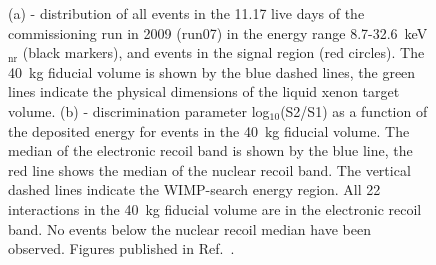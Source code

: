 \begin{figure}[!h]
\centering
{}
\caption[Spatial distribution of events observed in the commissioning run (run07 and discrimination parameter log$_{10}$(S2/S1) as a function of the nuclear recoil energy)]{
 (a) - distribution of all events in the 11.17 live days of the commissioning run in 2009 (run07) in the energy range 8.7-32.6~keV$_{\mathrm{nr}}$ (black markers), and events  in the signal region (red circles). The 40~kg fiducial volume is shown by the blue dashed lines, the green lines indicate the physical dimensions of the liquid xenon target volume. 
(b) - discrimination parameter log$_{10}$(S2/S1) as a function of the deposited energy for events in the 40~kg fiducial volume. The median of the electronic recoil band is shown by the blue line, the red line shows the median of the nuclear recoil band. The vertical dashed lines indicate the WIMP-search energy region. All 22 interactions in the 40~kg fiducial volume are in the electronic recoil band.
No events below the nuclear recoil median have been observed. 
Figures published in Ref.~\cite{xe100-run08}.}
\label{figRun07log10}
\end{figure}

